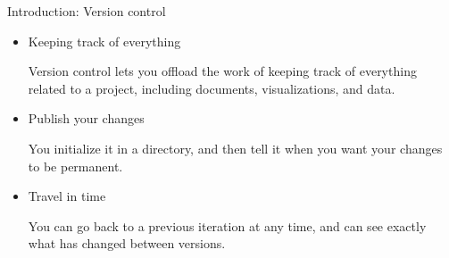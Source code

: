 \begin{frame}{Introduction: Version control}
  \begin{itemize}
    \item Keeping track of everything
    \begin{flushleft}
Version control lets you offload the work of keeping track of everything
related to a project, including documents, visualizations, and data.
    \end{flushleft}
    \item Publish your changes
    \begin{flushleft}
You initialize it in a directory, and then tell it when you want your changes
to be permanent.
    \end{flushleft}
    \item Travel in time
    \begin{flushleft}
You can go back to a previous iteration at any time, and can see exactly what
has changed between versions.
    \end{flushleft}
  \end{itemize}
\end{frame}
